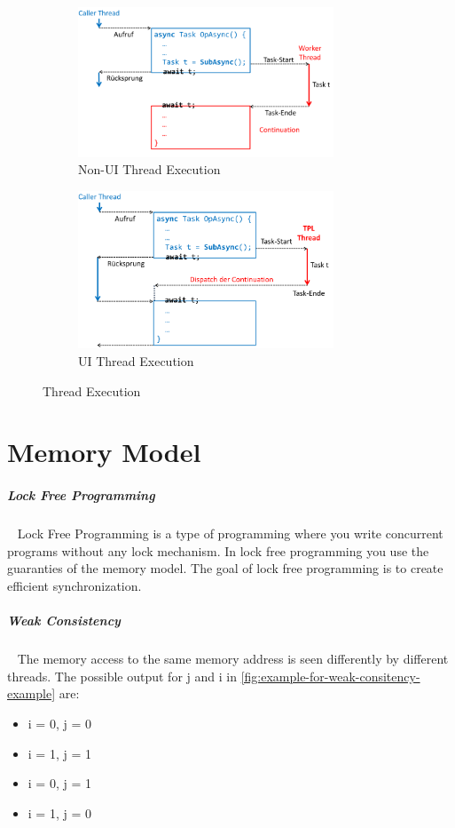 \documentclass[11pt,twoside,landscape]{article}
\begin{document}
\begin{multicols}{3}
{{\begin{figure}[H]
  \centering
  \begin{subfigure}{0.4\textwidth}
    \includegraphics[width=3in]{img/non_ui_thread.png}
    \caption{Non-UI Thread Execution \label{fig:non-ui-thread-execution}}
  \end{subfigure}
  \hfill
  \begin{subfigure}{0.4\textwidth}
    \includegraphics[width=3in]{img/ui_thread.png} 
    \caption{UI Thread Execution \label{fig:ui-thread-execution}}
  \end{subfigure}
  \caption{
    \label{fig:thread-execution}
    Thread Execution
  }
\end{figure}

\section{Memory Model}
\label{sec:org97ff05a}
\subparagraph{Lock Free Programming} \
\label{sec:orga6f74ca}
Lock Free Programming is a type of programming where you write concurrent programs without any lock mechanism.
In lock free programming you use the guaranties of the memory model.
The goal of lock free programming is to create efficient synchronization.

\subparagraph{Weak Consistency} \
\label{sec:orgbb39073}
The memory access to the same memory address is seen differently by different threads.
The possible output for j and i in \ref{fig:example-for-weak-consitency-example} are:
\begin{itemize}
\item i = 0, j = 0
\item i = 1, j = 1
\item i = 0, j = 1
\item i = 1, j = 0
\end{itemize}


}}
\end{multicols}
\end{document}
